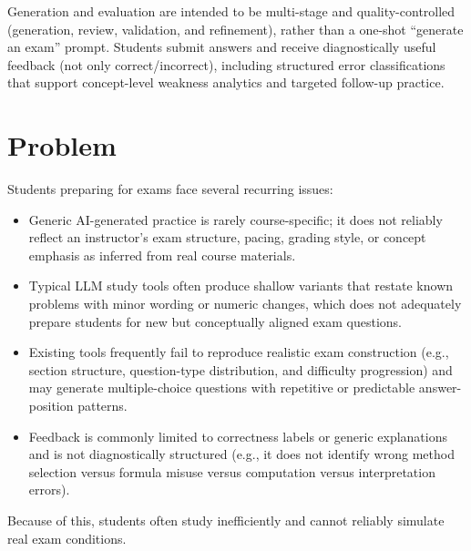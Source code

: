 \documentclass[11pt]{article}
\begin{document}
Generation and evaluation are intended to be multi-stage and quality-controlled (generation, review, validation, and refinement), rather than a one-shot ``generate an exam'' prompt. Students submit answers and receive diagnostically useful feedback (not only correct/incorrect), including structured error classifications that support concept-level weakness analytics and targeted follow-up practice.

\section{Problem}
Students preparing for exams face several recurring issues:

\begin{itemize}
\item Generic AI-generated practice is rarely course-specific; it does not reliably reflect an instructor's exam structure, pacing, grading style, or concept emphasis as inferred from real course materials.
\item Typical LLM study tools often produce shallow variants that restate known problems with minor wording or numeric changes, which does not adequately prepare students for new but conceptually aligned exam questions.
\item Existing tools frequently fail to reproduce realistic exam construction (e.g., section structure, question-type distribution, and difficulty progression) and may generate multiple-choice questions with repetitive or predictable answer-position patterns.
\item Feedback is commonly limited to correctness labels or generic explanations and is not diagnostically structured (e.g., it does not identify wrong method selection versus formula misuse versus computation versus interpretation errors).
\end{itemize}

Because of this, students often study inefficiently and cannot reliably simulate real exam conditions.
\end{document}
